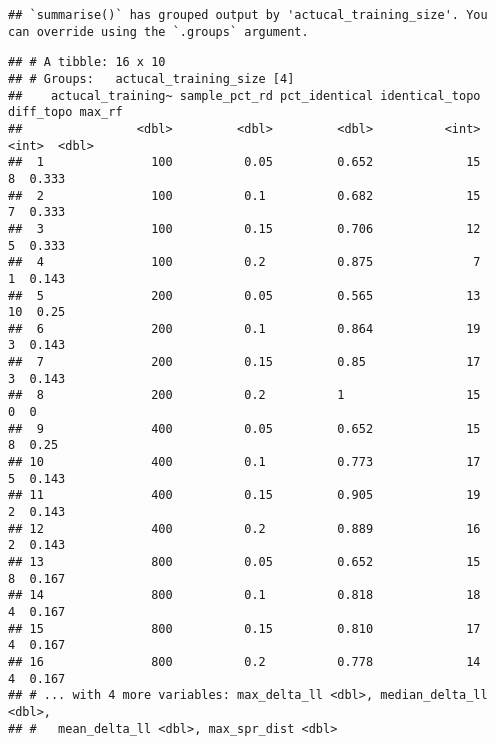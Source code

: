 \documentclass[
]{article}
\newenvironment{Shaded}{\begin{snugshade}}{\end{snugshade}}
\newcommand{\DataTypeTok}[1]{\textcolor[rgb]{0.13,0.29,0.53}{#1}}
\newcommand{\DecValTok}[1]{\textcolor[rgb]{0.00,0.00,0.81}{#1}}
\newcommand{\KeywordTok}[1]{\textcolor[rgb]{0.13,0.29,0.53}{\textbf{#1}}}
\newcommand{\NormalTok}[1]{#1}
\newcommand{\OperatorTok}[1]{\textcolor[rgb]{0.81,0.36,0.00}{\textbf{#1}}}
\newcommand{\StringTok}[1]{\textcolor[rgb]{0.31,0.60,0.02}{#1}}
\begin{document}
\begin{verbatim}
## `summarise()` has grouped output by 'actucal_training_size'. You can override using the `.groups` argument.
\end{verbatim}

\begin{verbatim}
## # A tibble: 16 x 10
## # Groups:   actucal_training_size [4]
##    actucal_training~ sample_pct_rd pct_identical identical_topo diff_topo max_rf
##                <dbl>         <dbl>         <dbl>          <int>     <int>  <dbl>
##  1               100          0.05         0.652             15         8  0.333
##  2               100          0.1          0.682             15         7  0.333
##  3               100          0.15         0.706             12         5  0.333
##  4               100          0.2          0.875              7         1  0.143
##  5               200          0.05         0.565             13        10  0.25 
##  6               200          0.1          0.864             19         3  0.143
##  7               200          0.15         0.85              17         3  0.143
##  8               200          0.2          1                 15         0  0    
##  9               400          0.05         0.652             15         8  0.25 
## 10               400          0.1          0.773             17         5  0.143
## 11               400          0.15         0.905             19         2  0.143
## 12               400          0.2          0.889             16         2  0.143
## 13               800          0.05         0.652             15         8  0.167
## 14               800          0.1          0.818             18         4  0.167
## 15               800          0.15         0.810             17         4  0.167
## 16               800          0.2          0.778             14         4  0.167
## # ... with 4 more variables: max_delta_ll <dbl>, median_delta_ll <dbl>,
## #   mean_delta_ll <dbl>, max_spr_dist <dbl>
\end{verbatim}

\begin{Shaded}
\end{Shaded}
\end{document}
